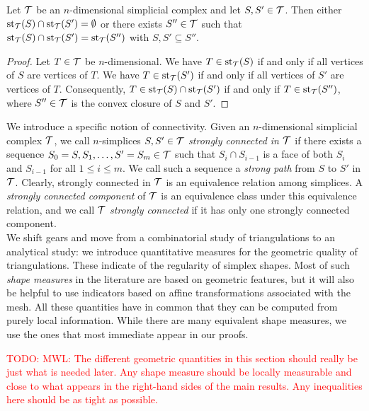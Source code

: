 \documentclass[10pt,letterpaper]{article}
\newcommand{\todo}[1]{\textcolor{red}{TODO: #1}}
\begin{document}
\begin{lemma}
 Let ${\mathcal T}$ be an $n$-dimensional simplicial complex and let $S,S' \in {\mathcal T}$.
 Then either $\operatorname{st}_{{\mathcal T}}(S) \cap \operatorname{st}_{{\mathcal T}}(S') = \emptyset$ or there exists $S'' \in {\mathcal T}$
 such that $\operatorname{st}_{{\mathcal T}}(S) \cap \operatorname{st}_{{\mathcal T}}(S') = \operatorname{st}_{{\mathcal T}}(S'')$ with $S, S' \subseteq S''$.
\end{lemma}
\begin{proof}
 Let $T \in {\mathcal T}$ be $n$-dimensional.
 We have $T \in \operatorname{st}_{{\mathcal T}}(S )$ if and only if all vertices of $S $ are vertices of $T$.
 We have $T \in \operatorname{st}_{{\mathcal T}}(S')$ if and only if all vertices of $S'$ are vertices of $T$.
 Consequently, $T \in \operatorname{st}_{{\mathcal T}}(S) \cap \operatorname{st}_{{\mathcal T}}(S')$ if and only if $T \in \operatorname{st}_{{\mathcal T}}(S'')$,
 where $S'' \in {\mathcal T}$ is the convex closure of $S$ and $S'$.
\end{proof}

We introduce a specific notion of connectivity. 
Given an $n$-dimensional simplicial complex ${\mathcal T}$, 
we call $n$-simplices $S,S' \in {\mathcal T}$ \emph{strongly connected in ${\mathcal T}$} if there exists a sequence $S_0=S,S_1,\dots,S'=S_m \in {\mathcal T}$ such that $S_{i} \cap S_{i-1}$ is a face of both $S_{i}$ and $S_{i-1}$ for all $1 \leq i \leq m$. %
We call such a sequence a \emph{strong path} from $S$ to $S'$ in ${\mathcal T}$. 
Clearly, strongly connected in ${\mathcal T}$ is an equivalence relation among simplices. 
A \emph{strongly connected component} of ${\mathcal T}$ is an equivalence class under this equivalence relation, 
and we call ${\mathcal T}$ \emph{strongly connected} if it has only one strongly connected component. 
\\



We shift gears and move from a combinatorial study of triangulations to an analytical study:
we introduce quantitative measures for the geometric quality of triangulations. 
These indicate of the regularity of simplex shapes. 
Most of such \emph{shape measures} in the literature are based on geometric features, 
but it will also be helpful to use indicators based on affine transformations associated with the mesh. %
All these quantities have in common that they can be computed from purely local information. 
While there are many equivalent shape measures, we use the ones that most immediate appear in our proofs.

\todo{MWL: The different geometric quantities in this section should really be just what is needed later. Any shape measure should be locally measurable and close to what appears in the right-hand sides of the main results. Any inequalities here should be as tight as possible. }
\end{document}

